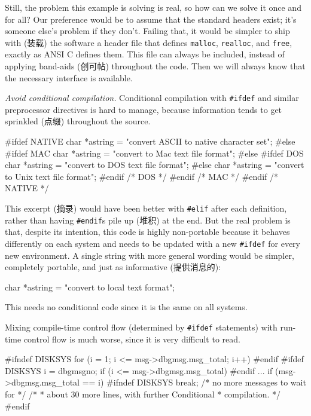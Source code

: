 Still, the problem this example is solving is real, so how can we solve it
once and for all? Our preference would be to assume that the standard
headers exist; it's someone else's problem if they don't. Failing that, it
would be simpler to ship with (装载) the software a header file that
defines \verb'malloc', \verb'realloc', and \verb'free', exactly as ANSI C
defines them. This file can always be included, instead of applying
band-aids (创可帖) throughout the code. Then we will always know that the
necessary interface is available.

\emph{Avoid conditional compilation.} Conditional compilation with
\verb'#ifdef' and similar preprocessor directives is hard to manage,
because information tends to get sprinkled (点缀) throughout the source.
\begin{badcode}
    #ifdef NATIVE
        char *astring = "convert ASCII to native character set";
    #else
    #ifdef MAC
        char *astring = "convert to Mac text file format";
    #else
    #ifdef DOS
        char *astring = "convert to DOS text file format";
    #else
        char *astring = "convert to Unix text file format";
    #endif /* DOS */
    #endif /* MAC */
    #endif /* NATIVE */
\end{badcode}
This excerpt (摘录) would have been better with \verb'#elif' after each definition,
rather than having \verb'#endif's pile up (堆积) at the end. But the real problem is that, despite its
intention, this
code is highly non-portable because it behaves differently on each system
and needs
to be updated with a new \verb'#ifdef' for every new environment. A single string
with
more general wording would be simpler, completely portable, and just as
informative (提供消息的):
\begin{wellcode}
    char *astring = "convert to local text format";
\end{wellcode}
This needs no conditional code since it is the same on all systems.

Mixing compile-time control flow (determined by \verb'#ifdef' statements)
with run-time control flow is much worse, since it is very difficult to
read.
\begin{badcode}
    #ifndef DISKSYS
        for (i = 1; i <= msg->dbgmsg.msg_total; i++)
    #endif
    #ifdef DISKSYS
        i = dbgmsgno;
        if (i <= msg->dbgmsg.msg_total)
    #endif
        {
            ...
            if (msg->dbgmsg.msg_total == i)
    #ifndef DISKSYS
                break; /* no more messages to wait for */
            /*
             * about 30 more lines, with further Conditional
             * compilation.
             */
    #endif
        }
\end{badcode}

